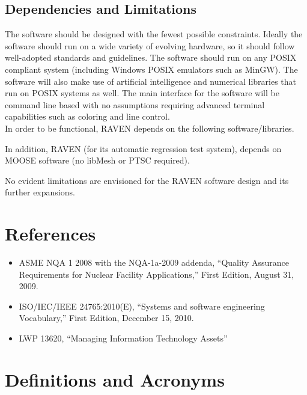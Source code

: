 \subsection{Dependencies and Limitations}
The software should be designed with the fewest possible constraints. 
Ideally the software should run on a wide variety of evolving hardware, 
so it should follow well-adopted standards and guidelines. The software
 should run on any POSIX compliant system (including Windows POSIX 
 emulators such as MinGW). The software will also make use of artificial 
 intelligence and numerical libraries that run on POSIX systems as well. 
 The main interface for the software will be command line based with no 
 assumptions requiring advanced terminal capabilities such as coloring and line control. 
 \\In order to be functional, RAVEN depends on the following software/libraries.

In addition, RAVEN (for its automatic regression test system), depends on MOOSE software (no libMesh or PTSC required).

No evident limitations are envisioned for the RAVEN software design and its further expansions.

\section{References}

\begin{itemize}

  \item ASME NQA 1 2008 with the NQA-1a-2009 addenda, ``Quality Assurance Requirements for Nuclear Facility Applications,'' First Edition, August 31, 2009.
  \item ISO/IEC/IEEE 24765:2010(E), ``Systems and software engineering Vocabulary,'' First Edition, December 15, 2010.
  \item LWP 13620, ``Managing Information Technology Assets''
\end{itemize}


\section{Definitions and Acronyms}

